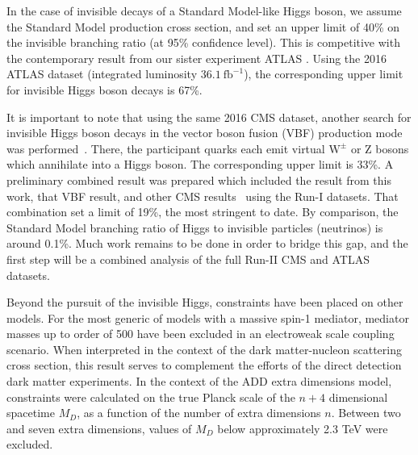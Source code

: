 In the case of invisible decays of a Standard Model-like Higgs boson,
we assume the Standard Model production cross section, and set an upper limit of 40\% on the invisible branching ratio (at 95\% confidence level).
This is competitive with the contemporary result from our sister experiment ATLAS \cite{Aaboud:2017bja}.
Using the 2016 ATLAS dataset (integrated luminosity $36.1~\mathrm{fb}^{-1}$), 
the corresponding upper limit for invisible Higgs boson decays is 67\%.

It is important to note that using the same 2016 CMS dataset,
another search for invisible Higgs boson decays in the vector boson fusion (VBF) production mode was performed~\cite{Sirunyan:2018owy}.
There, the participant quarks each emit virtual $\mathrm{W^\pm}$ or Z bosons which annihilate into a Higgs boson.
The corresponding upper limit is 33\%.
A preliminary combined result was prepared which included the result from this work, that VBF result, and other CMS results~\cite{Chatrchyan:2014tja} using the Run-I datasets.
That combination set a limit of 19\%, the most stringent to date.
By comparison, the Standard Model branching ratio of Higgs to invisible particles (neutrinos) is around 0.1\%.
Much work remains to be done in order to bridge this gap,
and the first step will be a combined analysis of the full Run-II CMS and ATLAS datasets.

Beyond the pursuit of the invisible Higgs, constraints have been placed on other models.
For the most generic of models with a massive spin-1 mediator,
mediator masses up to order of 500 \GeV have been excluded in an electroweak scale coupling scenario.
When interpreted in the context of the dark matter-nucleon scattering cross section,
this result serves to complement the efforts of the direct detection dark matter experiments.
In the context of the ADD extra dimensions model, constraints were calculated on the true Planck scale of the $n+4$ dimensional spacetime $M_D$, as a function of the number of extra dimensions $n$.
Between two and seven extra dimensions, values of $M_D$ below approximately 2.3 TeV were excluded.


